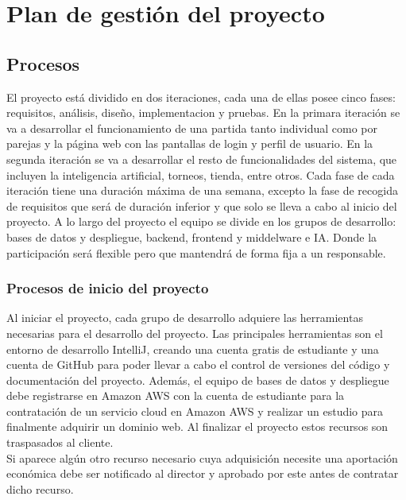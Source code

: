 \section{Plan de gestión del proyecto}
\label{planes}
\subsection{Procesos}
\label{procesos}

El proyecto está dividido en dos iteraciones, cada una de ellas posee cinco fases: requisitos, análisis, diseño, implementacion y pruebas. En la primara iteración se va a desarrollar el funcionamiento de una partida tanto individual como por parejas y la página web con las pantallas de login y perfil de usuario. En la segunda iteración se va a desarrollar el resto de funcionalidades del sistema, que incluyen la inteligencia artificial, torneos, tienda, entre otros.  Cada fase de cada iteración tiene una duración máxima de una semana, excepto la fase de recogida de requisitos que será de duración inferior y que solo se lleva a cabo al inicio del proyecto.
A lo largo del proyecto el equipo se divide en los grupos de desarrollo: bases de datos y despliegue, backend, frontend y middelware e IA. Donde la participación será flexible pero que mantendrá de forma fija a un responsable.

\subsubsection{Procesos de inicio del proyecto}

Al iniciar el proyecto, cada grupo de desarrollo adquiere las herramientas necesarias para el desarrollo del proyecto. Las principales herramientas son el entorno de desarrollo IntelliJ, creando una cuenta gratis de estudiante y una cuenta de GitHub para poder llevar a cabo el control de versiones del código y documentación del proyecto.
Además, el equipo  de bases de datos y despliegue debe registrarse en Amazon AWS con la cuenta de estudiante para la contratación de un servicio cloud en Amazon AWS y realizar un estudio para finalmente adquirir un dominio web.  Al finalizar el proyecto estos recursos son traspasados al cliente. \\
Si aparece algún otro recurso necesario cuya adquisición necesite una aportación económica debe ser notificado al director y aprobado por este antes de contratar dicho recurso.\\

